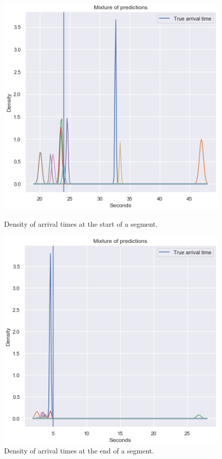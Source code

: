 \begin{figure}[H]
  \begin{minipage}{.46\textwidth}
    \includegraphics[width=\textwidth]{figures/mixture-start-of-traj.png}
    \caption{Density of arrival times at the start of a segment.}
    \label{fig:mixture-start-of-traj}
  \end{minipage}
  \hspace{5pt}
  \begin{minipage}{.46\textwidth}
    \includegraphics[width=\textwidth]{figures/mixture-end-of-traj.png}
    \caption{Density of arrival times at the end of a segment.}
    \label{fig:mixture-end-of-traj}
  \end{minipage}
\end{figure}

